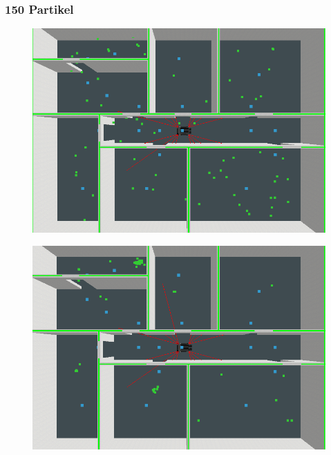 \documentclass{../Vorlage/mat}
\begin{document}
\subsubsection*{150 Partikel}
\begin{figure}[!htbp]
\centering
\begin{minipage}{.5\textwidth}
  \centering
  \includegraphics[scale=0.25]{1_150_schlecht.png}
  \label{fig1}
\end{minipage}%
\begin{minipage}{.5\textwidth}
  \centering
  \includegraphics[scale=0.25]{1_150_schlecht_nach_6.png}
  \label{fig2}
\end{minipage}
\centering

\end{figure}
\end{document}
